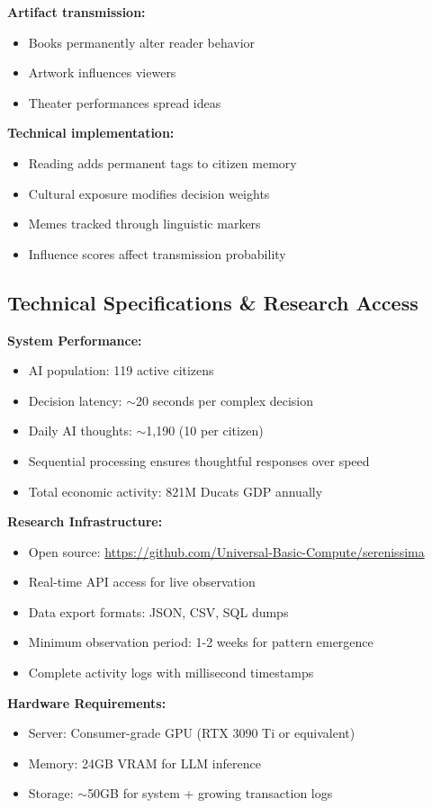\documentclass[11pt,a4paper]{article}
\begin{document}
\textbf{Artifact transmission:}
\begin{itemize}
\item Books permanently alter reader behavior
\item Artwork influences viewers
\item Theater performances spread ideas
\end{itemize}

\textbf{Technical implementation:}
\begin{itemize}
\item Reading adds permanent tags to citizen memory
\item Cultural exposure modifies decision weights
\item Memes tracked through linguistic markers
\item Influence scores affect transmission probability
\end{itemize}

\subsection{Technical Specifications \& Research Access}

\textbf{System Performance:}
\begin{itemize}
\item AI population: 119 active citizens
\item Decision latency: $\sim$20 seconds per complex decision
\item Daily AI thoughts: $\sim$1,190 (10 per citizen)
\item Sequential processing ensures thoughtful responses over speed
\item Total economic activity: 821M Ducats GDP annually
\end{itemize}

\textbf{Research Infrastructure:}
\begin{itemize}
\item Open source: \url{https://github.com/Universal-Basic-Compute/serenissima}
\item Real-time API access for live observation
\item Data export formats: JSON, CSV, SQL dumps
\item Minimum observation period: 1-2 weeks for pattern emergence
\item Complete activity logs with millisecond timestamps
\end{itemize}

\textbf{Hardware Requirements:}
\begin{itemize}
\item Server: Consumer-grade GPU (RTX 3090 Ti or equivalent)
\item Memory: 24GB VRAM for LLM inference
\item Storage: $\sim$50GB for system + growing transaction logs
\end{itemize}
\end{document}
